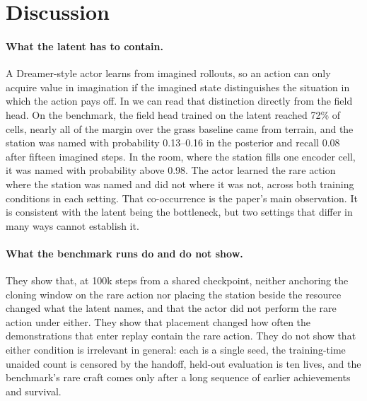 \section{Discussion}
\label{sec:discussion}

\paragraph{What the latent has to contain.}
A Dreamer-style actor learns from imagined rollouts, so an action can only acquire value in imagination if the imagined state distinguishes the situation in which the action pays off.
In \method{} we can read that distinction directly from the field head.
On the benchmark, the field head trained on the latent reached 72\% of cells, nearly all of the margin over the grass baseline came from terrain, and the station was named with probability 0.13--0.16 in the posterior and recall 0.08 after fifteen imagined steps.
In the room, where the station fills one encoder cell, it was named with probability above 0.98.
The actor learned the rare action where the station was named and did not where it was not, across both training conditions in each setting.
That co-occurrence is the paper's main observation.
It is consistent with the latent being the bottleneck, but two settings that differ in many ways cannot establish it.

\paragraph{What the benchmark runs do and do not show.}
They show that, at 100k steps from a shared checkpoint, neither anchoring the cloning window on the rare action nor placing the station beside the resource changed what the latent names, and that the actor did not perform the rare action under either.
They show that placement changed how often the demonstrations that enter replay contain the rare action.
They do not show that either condition is irrelevant in general: each is a single seed, the training-time unaided count is censored by the handoff, held-out evaluation is ten lives, and the benchmark's rare craft comes only after a long sequence of earlier achievements and survival.

